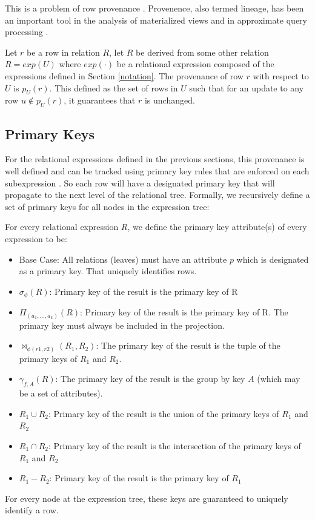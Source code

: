 This is a problem of row provenance \cite{DBLP:journals/vldb/CuiW03}.
Provenence, also termed lineage, has been an important tool in the analysis of materialized views \cite{DBLP:journals/vldb/CuiW03} and in approximate query processing \cite{DBLP:conf/sigmod/ZengGMZ14}.
\begin{definition}[Provenance]\label{prov}
Let $r$ be a row in relation $R$, let $R$ be derived from some other
relation $R = exp(U)$ where $exp(\cdot)$ be a relational
expression composed of the expressions defined in Section \ref{notation}.
The provenance of row $r$ with respect to $U$ is $p_U(r)$. 
This defined as the set of rows in $U$ such that for an update to any row $u \not\in p_U(r)$, it guarantees that $r$ is unchanged.
\end{definition}

\subsection{Primary Keys}
For the relational expressions defined in the previous sections, this provenance is well defined and can be tracked using primary key rules that are enforced on
each subexpression \cite{DBLP:journals/vldb/CuiW03}. 
So each row will have a designated primary key that will propagate to the next level of the relational tree.
Formally, we recursively define a set of primary keys for all nodes in the expression tree:
\begin{definition} 
For every relational expression $R$, we define the primary key attribute(s) of every expression to be:
\begin{itemize}[noitemsep]
\item Base Case: All relations (leaves) must have an attribute $p$ which is designated as a primary key. That uniquely identifies rows.
\item $\sigma_{\phi}(R)$: Primary key of the result is the primary key of R 
\item $\Pi_{(a_1,...,a_k)}(R)$: Primary key of the result is the primary key of R. The primary key must always be included in the projection.
\item $\bowtie_{\phi (r1,r2)}(R_1,R_2)$: The primary key of the result is the tuple of the primary keys of $R_1$ and $R_2$. 
\item $\gamma_{f,A}(R)$: The primary key of the result is the group by key $A$ (which may be a set of attributes).
\item $R_1 \cup R_2$: Primary key of the result is the union of the primary keys of $R_1$ and $R_2$
\item $R_1 \cap R_2$: Primary key of the result is the intersection of the primary keys of $R_1$ and $R_2$
\item $R_1 - R_2$: Primary key of the result is the primary key of $R_1$
\end{itemize}
For every node at the expression tree, these keys are guaranteed to uniquely identify a row.
\end{definition}
